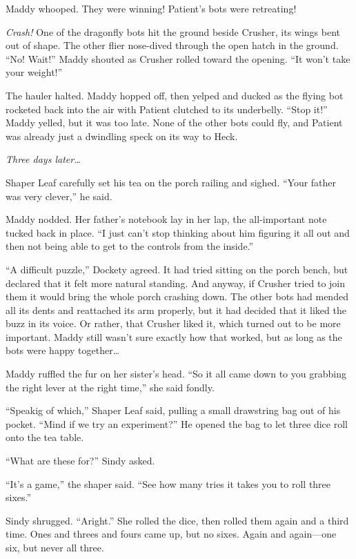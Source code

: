 \documentclass[10pt]{article}
\begin{document}
Maddy whooped. They were winning! Patient's bots were retreating!

\emph{Crash!} One of the dragonfly bots hit the ground beside Crusher,
its wings bent out of shape. The other flier nose-dived through the open
hatch in the ground. ``No! Wait!'' Maddy shouted as Crusher rolled
toward the opening. ``It won't take your weight!''

The hauler halted. Maddy hopped off, then yelped and ducked as the
flying bot rocketed back into the air with Patient clutched to its
underbelly. ``Stop it!'' Maddy yelled, but it was too late. None of the
other bots could fly, and Patient was already just a dwindling speck on
its way to Heck.

\emph{Three days later\ldots{}}

Shaper Leaf carefully set his tea on the porch railing and sighed.
``Your father was very clever,'' he said.

Maddy nodded. Her father's notebook lay in her lap, the all-important
note tucked back in place. ``I just can't stop thinking about him
figuring it all out and then not being able to get to the controls from
the inside.''

``A difficult puzzle,'' Dockety agreed. It had tried sitting on the
porch bench, but declared that it felt more natural standing. And
anyway, if Crusher tried to join them it would bring the whole porch
crashing down. The other bots had mended all its dents and reattached
its arm properly, but it had decided that it liked the buzz in its
voice. Or rather, that Crusher liked it, which turned out to be more
important. Maddy still wasn't sure exactly how that worked, but as long
as the bots were happy together\ldots{}

Maddy ruffled the fur on her sister's head. ``So it all came down to you
grabbing the right lever at the right time,'' she said fondly.

``Speakig of which,'' Shaper Leaf said, pulling a small drawstring bag
out of his pocket. ``Mind if we try an experiment?'' He opened the bag
to let three dice roll onto the tea table.

``What are these for?'' Sindy asked.

``It's a game,'' the shaper said. ``See how many tries it takes you to
roll three sixes.''

Sindy shrugged. ``Aright.'' She rolled the dice, then rolled them again
and a third time. Ones and threes and fours came up, but no sixes. Again
and again---one six, but never all three.
\end{document}
